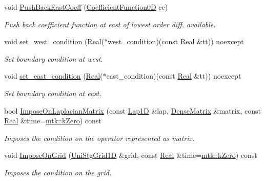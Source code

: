 \begin{DoxyCompactItemize}
void \hyperlink{classmtk_1_1RobinBCDescriptor1D_a7791c11e0950656cb5608a77918c28d4}{Push\+Back\+East\+Coeff} (\hyperlink{group__c07-mim__ops_ga04276745b4d511f0f3c636d6e0df7c2d}{Coefficient\+Function0\+D} ce)
\begin{DoxyCompactList}\small\item\em Push back coefficient function at east of lowest order diff. available. \end{DoxyCompactList}\item 
void \hyperlink{classmtk_1_1RobinBCDescriptor1D_a06bfaf0126d528247c3c76fdd19f4b85}{set\+\_\+west\+\_\+condition} (\hyperlink{group__c01-roots_gac080bbbf5cbb5502c9f00405f894857d}{Real}($\ast$west\+\_\+condition)(const \hyperlink{group__c01-roots_gac080bbbf5cbb5502c9f00405f894857d}{Real} \&tt)) noexcept
\begin{DoxyCompactList}\small\item\em Set boundary condition at west. \end{DoxyCompactList}\item 
void \hyperlink{classmtk_1_1RobinBCDescriptor1D_a4edc92eeaaaa3f1e7f2cedfea3d35681}{set\+\_\+east\+\_\+condition} (\hyperlink{group__c01-roots_gac080bbbf5cbb5502c9f00405f894857d}{Real}($\ast$east\+\_\+condition)(const \hyperlink{group__c01-roots_gac080bbbf5cbb5502c9f00405f894857d}{Real} \&tt)) noexcept
\begin{DoxyCompactList}\small\item\em Set boundary condition at east. \end{DoxyCompactList}\item 
bool \hyperlink{classmtk_1_1RobinBCDescriptor1D_ab8446428df923c27f388a85bd3f2c6d4}{Impose\+On\+Laplacian\+Matrix} (const \hyperlink{classmtk_1_1Lap1D}{Lap1\+D} \&lap, \hyperlink{classmtk_1_1DenseMatrix}{Dense\+Matrix} \&matrix, const \hyperlink{group__c01-roots_gac080bbbf5cbb5502c9f00405f894857d}{Real} \&time=\hyperlink{group__c01-roots_ga59a451a5fae30d59649bcda274fea271}{mtk\+::k\+Zero}) const 
\begin{DoxyCompactList}\small\item\em Imposes the condition on the operator represented as matrix. \end{DoxyCompactList}\item 
void \hyperlink{classmtk_1_1RobinBCDescriptor1D_ab0daec1d6c5c9c6768bea08281a3831d}{Impose\+On\+Grid} (\hyperlink{classmtk_1_1UniStgGrid1D}{Uni\+Stg\+Grid1\+D} \&grid, const \hyperlink{group__c01-roots_gac080bbbf5cbb5502c9f00405f894857d}{Real} \&time=\hyperlink{group__c01-roots_ga59a451a5fae30d59649bcda274fea271}{mtk\+::k\+Zero}) const 
\begin{DoxyCompactList}\small\item\em Imposes the condition on the grid. \end{DoxyCompactList}\end{DoxyCompactItemize}
